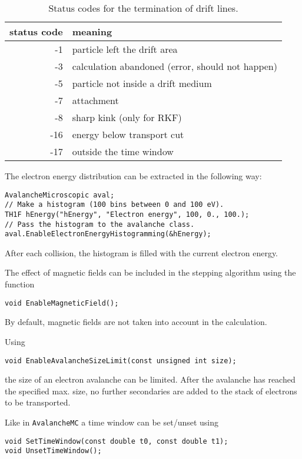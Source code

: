 \begin{table}
  \centering
  \begin{tabular}{r l}
    \toprule
    status code &  meaning\\
    \midrule
     -1 & particle left the drift area        \\
     -3 & calculation abandoned (error, should not happen) \\
     -5 & particle not inside a drift medium  \\
     -7 & attachment                          \\
     -8 & sharp kink (only for RKF)           \\
    -16 & energy below transport cut          \\
    -17 & outside the time window             \\
    \bottomrule
  \end{tabular}
  \caption{Status codes for the termination of drift lines.}
  \label{Tab:DriftLineStatusCodes}
\end{table}

The electron energy distribution can be extracted in the following way:
\begin{lstlisting}
AvalancheMicroscopic aval;
// Make a histogram (100 bins between 0 and 100 eV).
TH1F hEnergy("hEnergy", "Electron energy", 100, 0., 100.);
// Pass the histogram to the avalanche class.
aval.EnableElectronEnergyHistogramming(&hEnergy);
\end{lstlisting} 
After each collision, 
the histogram is filled with the current electron energy. 

The effect of magnetic fields can be included 
in the stepping algorithm using the function
\begin{lstlisting}
void EnableMagneticField();
\end{lstlisting}
By default, magnetic fields are not taken into account in the calculation.

Using 
\begin{lstlisting}
void EnableAvalancheSizeLimit(const unsigned int size);
\end{lstlisting}
the size of an electron avalanche can be limited. 
After the avalanche has reached the specified max. size, 
no further secondaries are added to the stack of electrons to be transported.  

Like in \texttt{AvalancheMC} a time window can be set/unset using
\begin{lstlisting}
void SetTimeWindow(const double t0, const double t1);
void UnsetTimeWindow();
\end{lstlisting}

